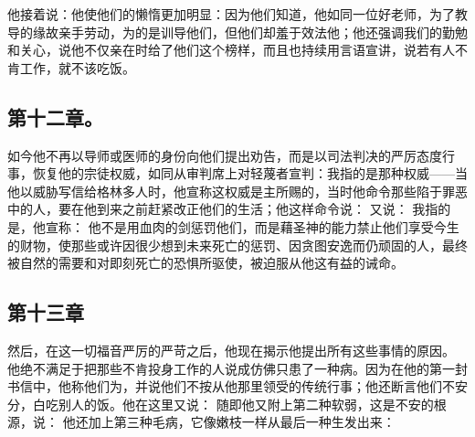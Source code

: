 \par

他接着说：他使他们的懒惰更加明显：因为他们知道，他如同一位好老师，为了教导的缘故亲手劳动，为的是训导他们，但他们却羞于效法他；他还强调我们的勤勉和关心，说他不仅亲在时给了他们这个榜样，而且也持续用言语宣讲，说若有人不肯工作，就不该吃饭。\par


\subsection{第十二章。}

\par

如今他不再以导师或医师的身份向他们提出劝告，而是以司法判决的严厉态度行事，恢复他的宗徒权威，如同从审判席上对轻蔑者宣判：我指的是那种权威——当他以威胁写信给格林多人时，他宣称这权威是主所赐的，当时他命令那些陷于罪恶中的人，要在他到来之前赶紧改正他们的生活；他这样命令说： 又说： 我指的是，他宣称： 他不是用血肉的剑惩罚他们，而是藉圣神的能力禁止他们享受今生的财物，使那些或许因很少想到未来死亡的惩罚、因贪图安逸而仍顽固的人，最终被自然的需要和对即刻死亡的恐惧所驱使，被迫服从他这有益的诫命。\par


\subsection{第十三章}

\par

然后，在这一切福音严厉的严苛之后，他现在揭示他提出所有这些事情的原因。 他绝不满足于把那些不肯投身工作的人说成仿佛只患了一种病。因为在他的第一封书信中，他称他们为，并说他们不按从他那里领受的传统行事；他还断言他们不安分，白吃别人的饭。他在这里又说： 随即他又附上第二种软弱，这是不安的根源，说： 他还加上第三种毛病，它像嫩枝一样从最后一种生发出来：\par

